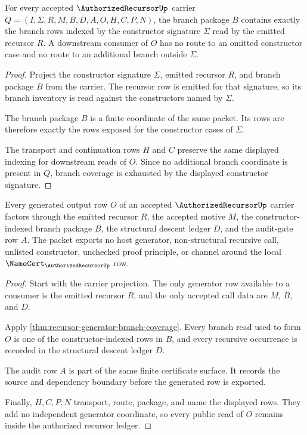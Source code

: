 \begin{theorem}
\label{thm:recursor-generator-branch-coverage}
For every accepted $\AuthorizedRecursorUp$ carrier $Q=(I,\Sigma,R,M,B,D,A,O,H,C,P,N)$, the branch package $B$ contains exactly the branch rows indexed by the constructor signature $\Sigma$ read by the emitted recursor $R$. A downstream consumer of $O$ has no route to an omitted constructor case and no route to an additional branch outside $\Sigma$.
\end{theorem}
\begin{proof}
Project the constructor signature $\Sigma$, emitted recursor $R$, and branch package $B$ from the carrier. The recursor row is emitted for that signature, so its branch inventory is read against the constructors named by $\Sigma$.

The branch package $B$ is a finite coordinate of the same packet. Its rows are therefore exactly the rows exposed for the constructor cases of $\Sigma$.

The transport and continuation rows $H$ and $C$ preserve the same displayed indexing for downstream reads of $O$. Since no additional branch coordinate is present in $Q$, branch coverage is exhausted by the displayed constructor signature.
\end{proof}

\begin{theorem}
\label{thm:recursor-generator-non-escape-ledger}
Every generated output row $O$ of an accepted $\AuthorizedRecursorUp$ carrier factors through the emitted recursor $R$, the accepted motive $M$, the constructor-indexed branch package $B$, the structural descent ledger $D$, and the audit-gate row $A$. The packet exports no host generator, non-structural recursive call, unlisted constructor, unchecked proof principle, or channel around the local $\NameCert_{\AuthorizedRecursorUp}$ row.
\end{theorem}
\begin{proof}
Start with the carrier projection. The only generator row available to a consumer is the emitted recursor $R$, and the only accepted call data are $M$, $B$, and $D$.

Apply \autoref{thm:recursor-generator-branch-coverage}. Every branch read used to form $O$ is one of the constructor-indexed rows in $B$, and every recursive occurrence is recorded in the structural descent ledger $D$.

The audit row $A$ is part of the same finite certificate surface. It records the source and dependency boundary before the generated row is exported.

Finally, $H,C,P,N$ transport, route, package, and name the displayed rows. They add no independent generator coordinate, so every public read of $O$ remains inside the authorized recursor ledger.
\end{proof}

